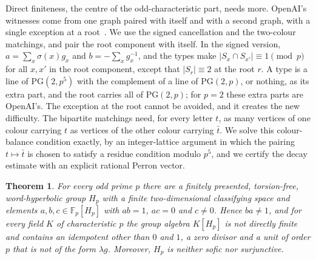\documentclass[11pt]{article}
\newtheorem{theorem}{Theorem}
\theoremstyle{definition}
\theoremstyle{plain}
\newcommand{\F}{\mathbb{F}}
\newcommand{\PG}{\mathrm{PG}}
\begin{document}
Direct finiteness, the centre of the odd-characteristic part, needs more. OpenAI's witnesses come from one graph paired with itself and with a second graph, with a single exception at a root~\cite[Prop.~2.1]{OAI197a}. We use the signed cancellation and the two-colour matchings, and pair the root component with itself. In the signed version, $a=\sum_x\sigma(x)g_x$ and $b=-\sum_xg_x^{-1}$, and the types make $|S_x\cap S_{x'}|\equiv1\pmod p$ for all $x,x'$ in the root component, except that $|S_r|\equiv2$ at the root $r$. A type is a line of $\PG(2,p^5)$ with the complement of a line of $\PG(2,p)$, or nothing, as its extra part, and the root carries all of $\PG(2,p)$; for $p=2$ these extra parts are OpenAI's. The exception at the root cannot be avoided, and it creates the new difficulty. The bipartite matchings need, for every letter $t$, as many vertices of one colour carrying $t$ as vertices of the other colour carrying $\bar t$. We solve this colour-balance condition exactly, by an integer-lattice argument in which the pairing $t\mapsto\bar t$ is chosen to satisfy a residue condition modulo $p^5$, and we certify the decay estimate with an explicit rational Perron vector.

\begin{tcolorbox}[headline]
\begin{theorem}\label{thm:E}
For every odd prime $p$ there are a finitely presented, torsion-free, word-hyperbolic group $H_p$ with a finite two-dimensional classifying space and elements $a,b,c\in\F_p[H_p]$ with $ab=1$, $ac=0$ and $c\neq0$. Hence $ba\neq1$, and for every field $K$ of characteristic $p$ the group algebra $K[H_p]$ is not directly finite and contains an idempotent other than $0$ and $1$, a zero divisor and a unit of order $p$ that is not of the form $\lambda g$. Moreover, $H_p$ is neither sofic nor surjunctive.
\end{theorem}
\end{tcolorbox}
\end{document}
